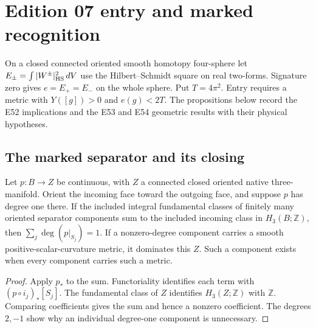 \section{Edition 07 entry and marked recognition}
\label{sec:ed07}

On a closed connected oriented smooth homotopy four-sphere let
$E_\pm=\int |W^\pm|_{\rm HS}^2\,dV$ use the Hilbert--Schmidt square on real two-forms. Signature zero gives $e=E_+=E_-$ on the whole sphere. Put
$T=4\pi^2$. Entry requires a metric with $Y([g])>0$ and $e(g)<2T$.
The propositions below record the E52 implications and the E53 and E54 geometric
results with their physical hypotheses.

\subsection{The marked separator and its closing}

\begin{proposition}
\label{prop:ed07-separator-degree}
\leanok
Let $p:B\to Z$ be continuous, with $Z$ a connected closed oriented
native three-manifold. Orient the incoming face toward the outgoing
face, and suppose $p$ has degree one there. If the included integral
fundamental classes of finitely many oriented separator components
sum to the included incoming class in $H_3(B;\mathbb Z)$, then
$\sum_j\deg(p|_{S_j})=1$. If a nonzero-degree component carries a
smooth positive-scalar-curvature metric, it dominates this $Z$.
Such a component exists when every component carries such a metric.
\end{proposition}
\begin{proof}
\leanok
Apply $p_*$ to the sum. Functoriality identifies each term with
$(p\circ i_j)_*[S_j]$. The fundamental class of $Z$ identifies
$H_3(Z;\mathbb Z)$ with $\mathbb Z$. Comparing coefficients gives the
sum and hence a nonzero coefficient. The degrees $2,-1$ show why an
individual degree-one component is unnecessary.
\end{proof}

